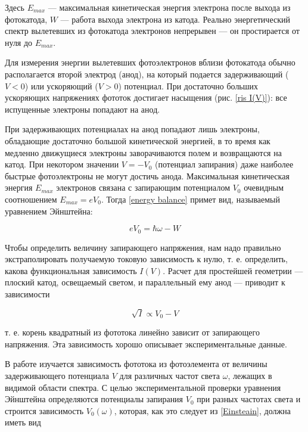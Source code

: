 \documentclass[a4paper,12pt]{report}
\begin{document}
	Здесь $ E_{max} $ ---  максимальная кинетическая энергия электрона после выхода из фотокатода, $ W $ --- работа выхода электрона из катода. Реально энергетический спектр вылетевших из фотокатода электронов непрерывен --- он простирается от нуля до $ E_{max} $. 
	
	Для измерения энергии вылетевших фотоэлектронов вблизи фотокатода
	обычно располагается второй электрод
	(анод), на который подается задерживающий ($ V < 0 $) или ускоряющий ($ V >
	0 $) потенциал. При достаточно больших
	ускоряющих напряжениях фототок достигает насыщения (рис. \ref{ris I(V)}): все испущенные электроны попадают на анод.
	
	При задерживающих потенциалах на анод попадают лишь электроны,
	обладающие достаточно большой кинетической энергией, в то время
	как медленно движущиеся электроны заворачиваются полем и возвращаются на катод. При некотором значении $ V = -V_0 $ (потенциал запирания) даже наиболее быстрые фотоэлектроны не могут достичь
	анода.
	Максимальная кинетическая энергия $ E_{max} $ электронов связана с
	запирающим потенциалом $ V_0 $ очевидным соотношением $ E_{max} = eV_0 $. Тогда \eqref{energy balance} примет вид, называемый уравнением Эйнштейна:
	
	\begin{equation}\label{Einsteain}
	eV_0 = \hbar\omega - W 
	\end{equation}
	
	Чтобы определить величину запирающего
	напряжения, нам надо правильно экстраполировать получаемую токовую зависимость к нулю, т. е. определить, какова функциональная
	зависимость $ I(V) $. Расчет для простейшей геометрии --- плоский катод, освещаемый светом, и параллельный ему анод --- приводит к зависимости
	
	\begin{equation}\label{sqrt I = V}
	\sqrt{I} \propto V_0 - V
	\end{equation}
	
	т. е. корень квадратный из фототока линейно
	зависит от запирающего напряжения. Эта зависимость хорошо описывает экспериментальные данные.
	
	В работе изучается зависимость фототока из фотоэлемента от величины задерживающего потенциала $ V $ для различных частот света $ \omega $, лежащих в видимой области спектра. С целью экспериментальной
	проверки уравнения Эйнштейна определяются потенциалы запирания
	$ V_0 $ при разных частотах света и строится зависимость $ V_0(\omega) $, которая, как это следует из \eqref{Einsteain}, должна иметь вид
	
\end{document}
